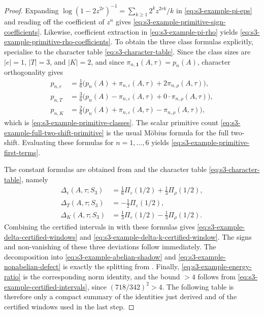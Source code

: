 \documentclass[11pt,a4paper]{amsart}
\theoremstyle{plain}
\theoremstyle{definition}
\theoremstyle{remark}
\begin{document}
\begin{proof}
  Expanding \(\log(1-2z^{2r})^{-1}=\sum_{k\ge 1}2^k z^{2rk}/k\) in
  \eqref{eq:s3-example-pi-eps} and reading off the coefficient of
  \(z^n\) gives \eqref{eq:s3-example-primitive-sign-coefficients}.
  Likewise, coefficient extraction in \eqref{eq:s3-example-pi-rho}
  yields \eqref{eq:s3-example-primitive-rho-coefficients}. To obtain the
  three class formulas explicitly, specialise
   to the character table
  \eqref{eq:s3-character-table}. Since the class sizes are
  \(|e|=1\), \(|T|=3\), and \(|K|=2\), and since
  \(\pi_{n,\mathbf1}(A,\tau)=p_n(A)\), character orthogonality gives
  \[
    \begin{aligned}
    p_{n,e}
      &=\frac{1}{6}\bigl(p_n(A)+\pi_{n,\varepsilon}(A,\tau)
        +2\pi_{n,\rho}(A,\tau)\bigr),\\
    p_{n,T}
      &=\frac{3}{6}\bigl(p_n(A)-\pi_{n,\varepsilon}(A,\tau)
        +0\cdot\pi_{n,\rho}(A,\tau)\bigr),\\
    p_{n,K}
      &=\frac{2}{6}\bigl(p_n(A)+\pi_{n,\varepsilon}(A,\tau)
        -\pi_{n,\rho}(A,\tau)\bigr),
    \end{aligned}
  \]
  which is \eqref{eq:s3-example-primitive-classes}. The scalar primitive
  count \eqref{eq:s3-example-full-two-shift-primitive} is the usual
  M\"obius formula for the full two-shift. Evaluating these formulas for
  \(n=1,\dots,6\) yields
  \eqref{eq:s3-example-primitive-first-terms}.

  The constant formulas are obtained from
   and the character table
  \eqref{eq:s3-character-table}, namely
  \[
    \begin{aligned}
      \Delta_e(A,\tau;S_3)
      &=\frac{1}{6}\Pi_\varepsilon(1/2)+\frac{1}{3}\Pi_\rho(1/2), \\
      \Delta_T(A,\tau;S_3)
      &=-\frac{1}{2}\Pi_\varepsilon(1/2), \\
      \Delta_K(A,\tau;S_3)
      &=\frac{1}{3}\Pi_\varepsilon(1/2)-\frac{1}{3}\Pi_\rho(1/2).
    \end{aligned}
  \]
  Combining the certified intervals in
   with these formulas gives
  \eqref{eq:s3-example-delta-certified-windows} and
  \eqref{eq:s3-example-delta-k-certified-window}. The signs and
  non-vanishing of these three deviations follow immediately.
  The decomposition into
  \eqref{eq:s3-example-abelian-shadow} and
  \eqref{eq:s3-example-nonabelian-defect} is exactly the splitting from
  . Finally,
  \eqref{eq:s3-example-energy-ratio} is the corresponding norm identity,
  and the bound \(>4\) follows from
  \eqref{eq:s3-example-certified-intervals}, since
  \((718/342)^2>4\). The following table is therefore only a compact
  summary of the identities just derived and of the certified windows used
  in the last step.
\end{proof}
\end{document}
